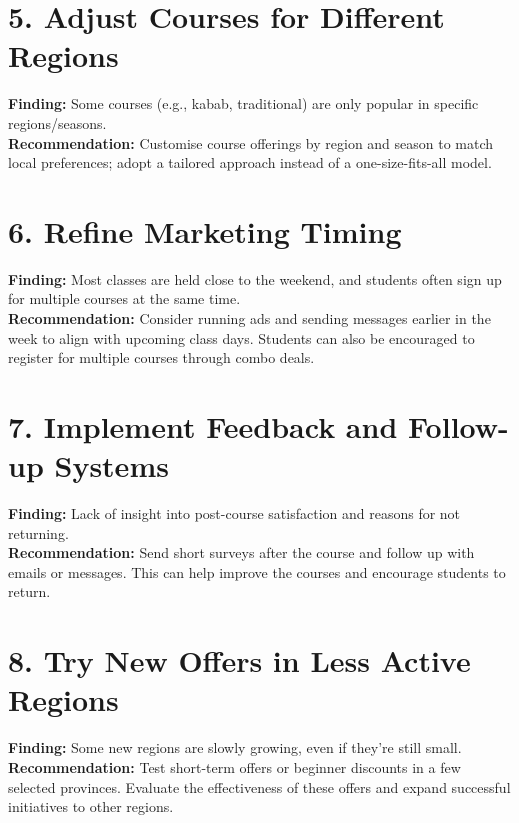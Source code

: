 \documentclass[12pt,a4paper]{article}
\begin{document}
\section*{5. Adjust Courses for Different Regions}
\textbf{Finding:} Some courses (e.g., kabab, traditional) are only popular in specific regions/seasons. \\
\textbf{Recommendation:} Customise course offerings by region and season to match local preferences; adopt a tailored approach instead of a one-size-fits-all model.

\section*{6. Refine Marketing Timing}
\textbf{Finding:} Most classes are held close to the weekend, and students often sign up for multiple courses at the same time. \\
\textbf{Recommendation:} Consider running ads and sending messages earlier in the week to align with upcoming class days. Students can also be encouraged to register for multiple courses through combo deals.

\section*{7. Implement Feedback and Follow-up Systems}
\textbf{Finding:} Lack of insight into post-course satisfaction and reasons for not returning. \\
\textbf{Recommendation:} Send short surveys after the course and follow up with emails or messages. This can help improve the courses and encourage students to return.

\section*{8. Try New Offers in Less Active Regions}
\textbf{Finding:} Some new regions are slowly growing, even if they’re still small. \\
\textbf{Recommendation:} Test short-term offers or beginner discounts in a few selected provinces. Evaluate the effectiveness of these offers and expand successful initiatives to other regions.
\end{document}
